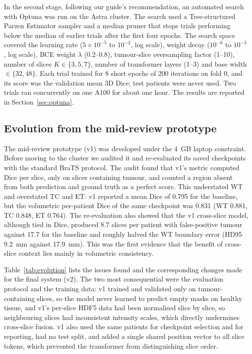 In the second stage, following our guide's recommendation, an automated search with Optuna \cite{akiba2019} was run on the Astra cluster. The search used a Tree-structured Parzen Estimator sampler and a median pruner that stops trials performing below the median of earlier trials after the first four epochs. The search space covered the learning rate ($5 \times 10^{-5}$ to $10^{-3}$, log scale), weight decay ($10^{-6}$ to $10^{-3}$, log scale), BCE weight $\lambda$ (0.2--0.8), tumour-slice oversampling factor (1--10), number of slices $K \in \{3,5,7\}$, number of transformer layers (1--3) and base width $\in \{32, 48\}$. Each trial trained for 8 short epochs of 200 iterations on fold 0, and its score was the validation mean 3D Dice; test patients were never used. Two trials ran concurrently on one A100 for about one hour. The results are reported in Section~\ref{sec:optuna}.

\subsection{Evolution from the mid-review prototype}\label{sec:evolution}
The mid-review prototype (v1) was developed under the 4~GB laptop constraint. Before moving to the cluster we audited it and re-evaluated its saved checkpoints with the standard BraTS protocol. The audit found that v1's metric computed Dice per slice, only on slices containing tumour, and counted a region absent from both prediction and ground truth as a perfect score. This understated WT and overstated TC and ET: v1 reported a mean Dice of 0.795 for the baseline, but the volumetric per-patient Dice of the same checkpoint was 0.831 (WT 0.881, TC 0.848, ET 0.764). The re-evaluation also showed that the v1 cross-slice model, although tied in Dice, produced 8.7 slices per patient with false-positive tumour against 17.7 for the baseline and roughly halved the WT boundary error (HD95 9.2~mm against 17.9~mm). This was the first evidence that the benefit of cross-slice context lies mainly in volumetric consistency.

Table~\ref{tab:evolution} lists the issues found and the corresponding changes made for the final system (v2). The two most consequential were the evaluation protocol and the training data: v1 trained and validated only on tumour-containing slices, so the model never learned to predict empty masks on healthy tissue, and v1's per-slice HDF5 data had been normalised slice by slice, so neighbouring slices had inconsistent intensity scales, which directly undermines cross-slice fusion. v1 also used the same patients for checkpoint selection and for reporting, had no test split, and added a single shared position vector to all slice tokens, which prevented the transformer from distinguishing slice order.

